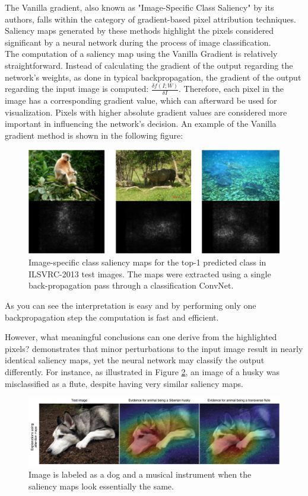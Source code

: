 The Vanilla gradient, also known as "Image-Specific Class Saliency" by its authors, falls within the category of gradient-based pixel attribution techniques. Saliency maps generated by these methods highlight the pixels considered significant by a neural network during the process of image classification.\\
The computation of a saliency map using the Vanilla Gradient is relatively straightforward. Instead of calculating the gradient of the output regarding the network's weights, as done in typical backpropagation, the gradient of the output regarding the input image is computed: $\frac{\delta f(I;W)}{\delta I}$. Therefore, each pixel in the image has a corresponding gradient value, which can afterward be used for visualization. Pixels with higher absolute gradient values are considered more important in influencing the network's decision. An example of the Vanilla gradient method is shown in the following figure:

\begin{figure}[H]
    \centering
    \includegraphics[width=0.9\linewidth]{pics/sal_map.pdf}
    \caption{Image-specific class saliency maps for the top-1 predicted class in ILSVRC-2013 test images. The maps were extracted using a single back-propagation pass through a classification ConvNet.\cite{simonyan2014deep}}
    \label{fig:sal_ap}
\end{figure}
As you can see the interpretation is easy and by performing only one backpropagation step the computation is fast and efficient. 

However, what meaningful conclusions can one derive from the highlighted pixels? \cite{Ghorbani_Abid_Zou_2019} demonstrates that minor perturbations to the input image result in nearly identical saliency maps, yet the neural network may classify the output differently. For instance, as illustrated in Figure \ref{fig:saliency_husky}, an image of a husky was misclassified as a flute, despite having very similar saliency maps.

\begin{figure}[H]
    \centering
    \includegraphics[width=0.9\linewidth]{pics/saliency_husky.png}
    \caption{Image is labeled as a dog and a musical instrument when the saliency maps look essentially the same. \cite{Ghorbani_Abid_Zou_2019}}
    \label{fig:saliency_husky}
\end{figure}

